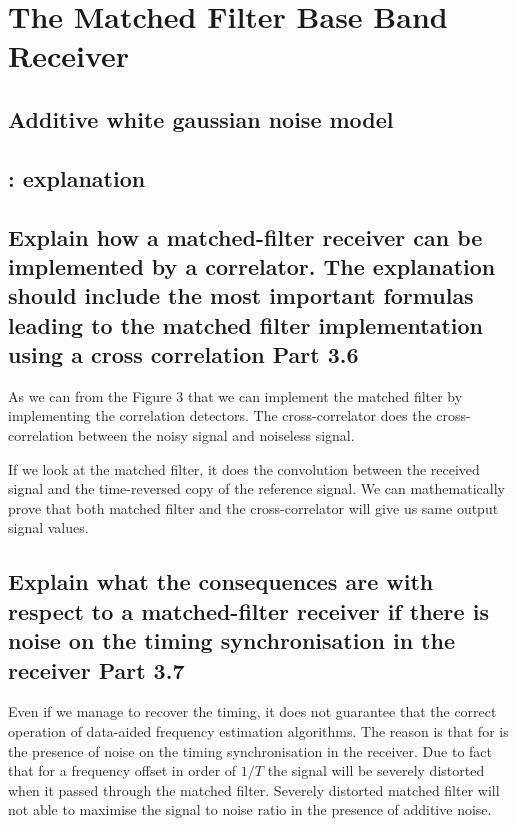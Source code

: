 \section{The Matched Filter Base Band Receiver}



\subsection{Additive white gaussian noise model}



\subsection{: explanation}


\subsection{ Explain how a matched-filter receiver can be implemented by a correlator. The explanation should include the most important formulas leading to the matched filter implementation using a cross correlation Part 3.6}
As we can from the Figure 3 that we can implement the matched filter by implementing the correlation detectors. The cross-correlator does the cross-correlation between the noisy signal and noiseless signal. 

If we look at the matched filter, it does the convolution between the received signal and the time-reversed copy of the reference signal. We can mathematically prove that both matched filter and the cross-correlator will give us same output signal values.

\subsection{ Explain what the consequences are with respect to a matched-filter receiver if there is noise on the timing synchronisation in the receiver Part 3.7}
 
Even if we manage to recover the timing, it does not guarantee that the correct operation of data-aided frequency estimation algorithms. The reason is that for is the presence of noise on the timing synchronisation in the receiver. Due to fact that for a frequency offset in order of $1/T$ the signal will be severely distorted when it passed through the matched filter. Severely distorted matched filter will not able to maximise the signal to noise ratio in the presence of additive noise.

